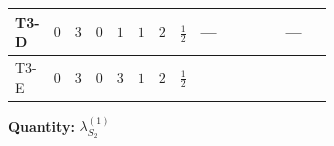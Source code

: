 \documentclass[8pt]{article}
\begin{document}
\begin{landscape}
\begin{longtable}{@{}llcccccc >{\raggedright\arraybackslash}p{0.21\linewidth} >{\raggedright\arraybackslash}p{0.21\linewidth} >{\raggedright\arraybackslash}p{0.21\linewidth}@{}}
\midrule
T3-D & $0$ & $3$ & $0$ & $1$ & $1$ & $2$ & $\frac{1}{2}$ & --- & \scriptsize\adjustbox{max width=\linewidth}{$\begin{gathered} +10 {\lambda_{S_2}^{(1)}}^2\end{gathered}$} & --- \\
\midrule
T3-E & $0$ & $3$ & $0$ & $3$ & $1$ & $2$ & $\frac{1}{2}$ & \scriptsize\adjustbox{max width=\linewidth}{$\begin{gathered} +\frac{3 {\lambda_{HS_2}^{(A)}}^2}{2}\end{gathered}$} & \scriptsize\adjustbox{max width=\linewidth}{$\begin{gathered} +14 {\lambda_{S_2}^{(1)}}^2\end{gathered}$} & \scriptsize\adjustbox{max width=\linewidth}{$\begin{gathered} +14 {\lambda_{S_2}^{(1)}} {\lambda_{S_2}^{(A)}}\end{gathered}$} \\
\midrule
\bottomrule
\end{longtable}
\clearpage
\noindent\textbf{Quantity: }$\lambda_{S_2}^{(1)}$\par\smallskip

\end{landscape}
\end{document}
